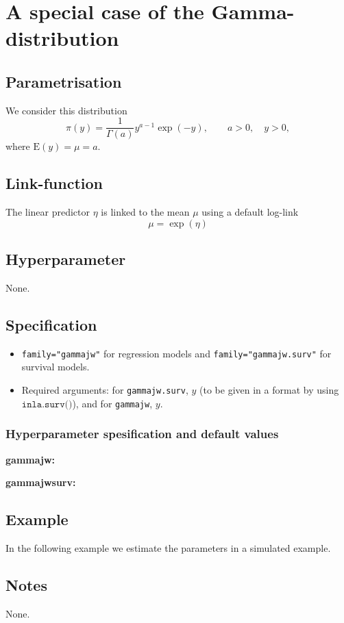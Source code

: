 \documentclass[a4paper,11pt]{article}
\begin{document}
\section*{A special case of the Gamma-distribution}

\subsection*{Parametrisation}

We consider this distribution
\begin{displaymath}
    \pi(y) = \frac{1}{\Gamma(a)} y^{a-1} \exp(-y), \qquad a>0,
    \quad y >0,
\end{displaymath}
where $\text{E}(y) = \mu = a$.

\subsection*{Link-function}

The linear predictor $\eta$ is linked to the mean $\mu$ using a
default log-link
\begin{displaymath}
    \mu = \exp(\eta)
\end{displaymath}

\subsection*{Hyperparameter}

None.

\subsection*{Specification}

\begin{itemize}
\item \texttt{family="gammajw"} for regression models and
    \texttt{family="gammajw.surv"} for survival models.
\item Required arguments: for \texttt{gammajw.surv}, $y$ (to be given in
    a format by using $\texttt{inla.surv()}$), and for \texttt{gammajw},
    $y$.
\end{itemize}

\subsubsection*{Hyperparameter spesification and default values}

\textbf{gammajw:}


\textbf{gammajwsurv:}


\subsection*{Example}

In the following example we estimate the parameters in a simulated
example.


\subsection*{Notes}

None.
\end{document}
